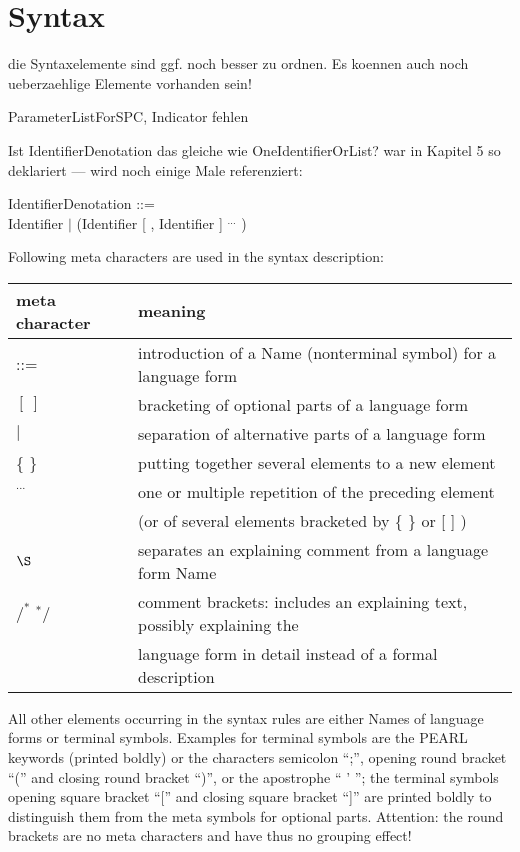 \newpage
\section{Syntax}    %
\begin{discuss}
die Syntaxelemente sind ggf. noch besser zu ordnen.
Es koennen auch noch ueberzaehlige Elemente vorhanden sein!

ParameterListForSPC, Indicator fehlen

Ist IdentifierDenotation das gleiche wie OneIdentifierOrList?
war in Kapitel 5 so deklariert --- wird noch einige Male referenziert:

IdentifierDenotation ::=\\
\x Identifier $\mid$ (Identifier [ , Identifier ] $^{...}$ )


\end{discuss}

Following meta characters are used in the syntax description:\\ 

\begin{tabular}{ll}
meta character & meaning \\ \hline
::=            & introduction of a Name (nonterminal symbol) for a language form\\
$[\ ]$         & bracketing of optional parts of a language form \\ 
$\mid$         & separation of alternative parts of a language form\\
\{ \}          & putting together several elements to a new element\\
$^{...}$       & one or multiple repetition of the preceding element\\
               & (or of several elements bracketed by \{ \} or [ ] ) \\
$\S $          & separates an explaining comment from a language form Name\\
$/^*$ $^*/$    & comment brackets: 
                 includes an explaining text, possibly explaining the\\
               & language form in detail instead of a formal description\\
\end{tabular}

All other elements occurring in the syntax rules are either Names of language
forms or terminal symbols. Examples for terminal symbols are the PEARL
keywords (printed boldly) or the characters semicolon ``;'', opening round
bracket ``('' and closing round bracket ``)'', 
or the apostrophe `` ' ''; the terminal symbols opening square bracket ``[''
and closing square bracket ``]'' are printed boldly to distinguish them
from the meta symbols for optional parts. Attention: the round brackets are
no meta characters and have thus no grouping effect!\\

